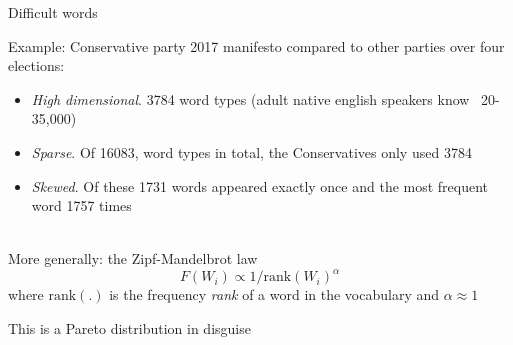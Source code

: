 \documentclass{hertieteaching}\usepackage[]{graphicx}\usepackage[]{color}
\begin{document}
\begin{frame}{Difficult words}

Example: Conservative party 2017 manifesto compared to other parties over four elections:

\begin{itemize}
  \item \textit{High dimensional}.  3784 word types (adult native english speakers know ~20-35,000)
  \item \textit{Sparse}. Of 16083, word types in total, the Conservatives only used 3784
  \item \textit{Skewed}. Of these 1731 words appeared exactly once and the most frequent word 1757 times
\end{itemize}

\pause 
~\\
More generally: the Zipf-Mandelbrot law \parencite{Zipf1932,Mandelbrot1966}
$$
F(W_i) \propto 1/{\text{rank}(W_i)^\alpha}
$$
where $\text{rank}(.)$ is the
frequency \textit{rank} of a word in the vocabulary and
$\alpha\approx 1$

This is a Pareto distribution in disguise

\end{frame}
\end{document}

